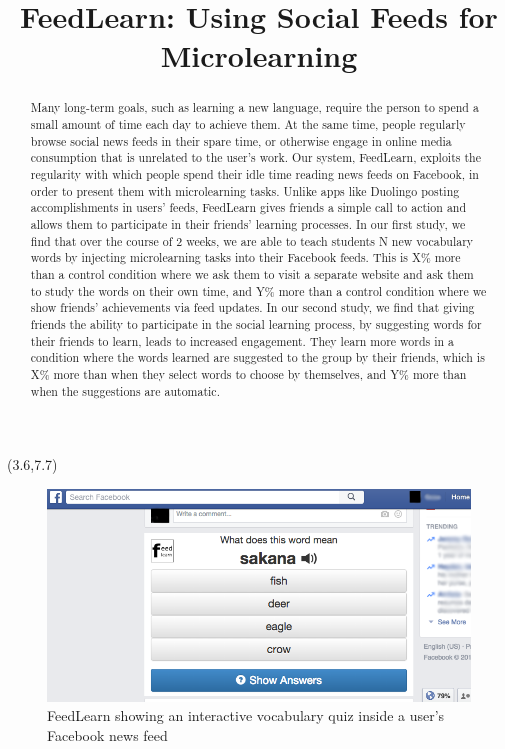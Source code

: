 \documentclass{chi-ext}
\title{FeedLearn: Using Social Feeds for Microlearning}
\author{
  \alignauthor{
  	\textbf{Geza Kovacs}\\
  	\affaddr{Department of Computer Science, Stanford University}\\
  	\email{geza@cs.stanford.edu}
  }
}
\begin{document}
\maketitle

\begin{textblock}{5}(3.6,7.7)
\begin{figure}
\includegraphics[width=\columnwidth]{feedlearn-screenshot.png}
\caption{FeedLearn showing an interactive vocabulary quiz inside a user's Facebook news feed}
\end{figure}
\end{textblock}

\begin{abstract}
Many long-term goals, such as learning a new language,
require the person to spend a small amount of time each day to achieve them.
At the same time, people regularly browse social news feeds in their spare time, or otherwise
engage in online media consumption that is unrelated to the user's work.
Our system, FeedLearn, exploits the regularity with which people spend their idle time reading news feeds on Facebook,
in order to present them with microlearning tasks. Unlike apps like Duolingo posting accomplishments in users' feeds, FeedLearn gives friends a simple call to action and allows them to participate in their friends' learning processes.
In our first study, we find that over the course of 2 weeks, we are able to teach students N new vocabulary words by injecting microlearning tasks into their Facebook feeds. This is X\% more than a control condition where we ask them to visit a separate website and ask them to study the words on their own time, and Y\% more than a control condition where we show friends' achievements via feed updates. In our second study, we find that giving friends the ability to participate in the social learning process, by suggesting words for their friends to learn, leads to increased engagement. They learn more words in a condition where the words learned are suggested to the group by their friends, which is X\% more than when they select words to choose by themselves, and Y\% more than when the suggestions are automatic.
\end{abstract}
\end{document}
